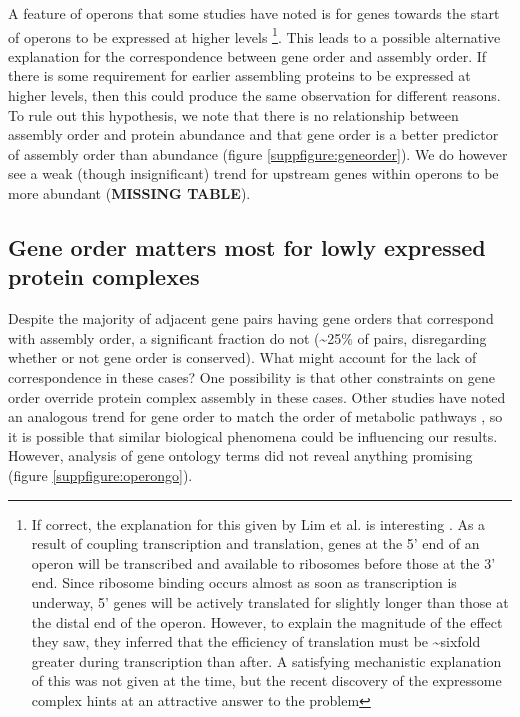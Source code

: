 \documentclass[a4paper,11pt,twoside,openright]{scrbook}
\begin{document}
A feature of operons that some studies have noted is for genes towards the start of operons to be expressed at higher levels \cite{Nishizaki2007,Lim2011} \footnote{If correct, the explanation for this given by Lim et al. is interesting \cite{Lim2011}. As a result of coupling transcription and translation, genes at the 5' end of an operon will be transcribed and available to ribosomes before those at the 3' end. Since ribosome binding occurs almost as soon as transcription is underway, 5' genes will be actively translated for slightly longer than those at the distal end of the operon. However, to explain the magnitude of the effect they saw, they inferred that the efficiency of translation must be \textasciitilde sixfold greater during transcription than after. A satisfying mechanistic explanation of this was not given at the time, but the recent discovery of the expressome complex \cite{Kohler2017} hints at an attractive answer to the problem}. This leads to a possible alternative explanation for the correspondence between gene order and assembly order. If there is some requirement for earlier assembling proteins to be expressed at higher levels, then this could produce the same observation for different reasons. To rule out this hypothesis, we note that there is no relationship between assembly order and protein abundance and that gene order is a better predictor of assembly order than abundance (figure \ref{suppfigure:geneorder}). We do however see a weak (though insignificant) trend for upstream genes within operons to be more abundant (\textbf{MISSING TABLE}).

\subsection{Gene order matters most for lowly expressed protein complexes}
Despite the majority of adjacent gene pairs having gene orders that correspond with assembly order, a significant fraction do not (\textasciitilde 25\% of pairs, disregarding whether or not gene order is conserved). What might account for the lack of correspondence in these cases? One possibility is that other constraints on gene order override protein complex assembly in these cases. Other studies have noted an analogous trend for gene order to match the order of metabolic pathways \cite{Zaslaver2004,Kovacs2009}, so it is possible that similar biological phenomena could be influencing our results. However, analysis of gene ontology terms \cite{Huntley2015} did not reveal anything promising (figure \ref{suppfigure:operongo}).
\end{document}
